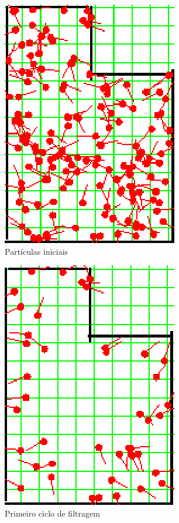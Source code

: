\begin{figure}[H]
  \centering
  \includegraphics[scale=1]{figuras/cen4_ex3/1.eps}
  \caption[Partículas Iniciais]{Partículas iniciais}
  \label{img:cen4_ex3_1}
\end{figure}

\begin{figure}[H]
  \centering
  \includegraphics[scale=1]{figuras/cen4_ex3/2.eps}
  \caption[Primeiro Ciclo de Filtragem]{Primeiro ciclo de filtragem}
  \label{img:cen4_ex3_2}
\end{figure}

